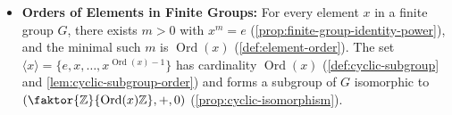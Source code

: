 \begin{overview}
\begin{itemize}
    \item \textbf{Orders of Elements in Finite Groups:} For every element $x$ in a finite group $G$, there exists $m > 0$ with $x^m = e$ (\cref{prop:finite-group-identity-power}), and the minimal such $m$ is $\operatorname{Ord}(x)$ (\cref{def:element-order}). The set $\langle x \rangle = \{e, x, \dots, x^{\operatorname{Ord}(x)-1}\}$ has cardinality $\operatorname{Ord}(x)$ (\cref{def:cyclic-subgroup} and \cref{lem:cyclic-subgroup-order}) and forms a subgroup of $G$ isomorphic to $(\faktor{\mathbb{Z}}{\operatorname{Ord}(x)\mathbb{Z}}, +, 0)$ (\cref{prop:cyclic-isomorphism}).
\end{itemize}
\end{overview}